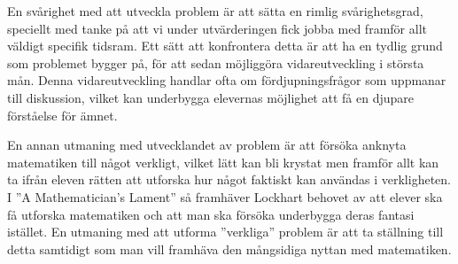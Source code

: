 \textcolor{Mahogany}{En svårighet med att utveckla problem är att sätta en rimlig svårighetsgrad, speciellt med tanke på att vi under utvärderingen fick jobba med framför allt väldigt specifik tidsram. Ett sätt att konfrontera detta är att ha en tydlig grund som problemet bygger på, för att sedan möjliggöra vidareutveckling i största mån. Denna vidareutveckling handlar ofta om fördjupningsfrågor som uppmanar till diskussion, vilket kan underbygga elevernas möjlighet att få en djupare förståelse för ämnet.}

\textcolor{Mahogany}{En annan utmaning med utvecklandet av problem är att försöka anknyta matematiken till något verkligt, vilket lätt kan bli krystat men framför allt kan ta ifrån eleven rätten att utforska hur något faktiskt kan användas i verkligheten. I ''A Mathematician's Lament'' \cite{lockhart} så framhäver Lockhart behovet av att elever ska få utforska matematiken och att man ska försöka underbygga deras fantasi istället. En utmaning med att utforma ''verkliga'' problem är att ta ställning till detta samtidigt som man vill framhäva den mångsidiga nyttan med matematiken.}
